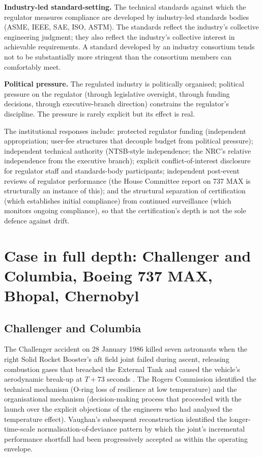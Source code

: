 \textbf{Industry-led standard-setting.} The technical standards against which the regulator measures compliance are developed by industry-led standards bodies (ASME, IEEE, SAE, ISO, ASTM). The standards reflect the industry's collective engineering judgment; they also reflect the industry's collective interest in achievable requirements. A standard developed by an industry consortium tends not to be substantially more stringent than the consortium members can comfortably meet.

\textbf{Political pressure.} The regulated industry is politically organised; political pressure on the regulator (through legislative oversight, through funding decisions, through executive-branch direction) constrains the regulator's discipline. The pressure is rarely explicit but its effect is real.

The institutional responses include: protected regulator funding (independent appropriation; user-fee structures that decouple budget from political pressure); independent technical authority (NTSB-style independence; the NRC's relative independence from the executive branch); explicit conflict-of-interest disclosure for regulator staff and standards-body participants; independent post-event reviews of regulator performance (the House Committee report on 737 MAX is structurally an instance of this); and the structural separation of certification (which establishes initial compliance) from continued surveillance (which monitors ongoing compliance), so that the certification's depth is not the sole defence against drift.

\section{Case in full depth: Challenger and Columbia, Boeing 737 MAX, Bhopal, Chernobyl}

\subsection*{Challenger and Columbia}

The Challenger accident on 28 January 1986 killed seven astronauts when the right Solid Rocket Booster's aft field joint failed during ascent, releasing combustion gases that breached the External Tank and caused the vehicle's aerodynamic break-up at $T+73$ seconds \cite{acc:nasa-challenger}. The Rogers Commission identified the technical mechanism (O-ring loss of resilience at low temperature) and the organisational mechanism (decision-making process that proceeded with the launch over the explicit objections of the engineers who had analysed the temperature effect). Vaughan's subsequent reconstruction \cite{hist:vaughan1996} identified the longer-time-scale normalisation-of-deviance pattern by which the joint's incremental performance shortfall had been progressively accepted as within the operating envelope.

